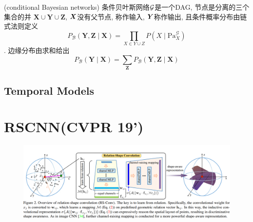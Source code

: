\documentclass{article}
\begin{document}
\begin{flushleft}
    \begin{definition}
        (conditional Bayesian networks) 条件贝叶斯网络$\cal G$是一个DAG, 节点是分离的三个集合的并 $\boldsymbol{X} \cup \boldsymbol{Y} \cup \boldsymbol{Z}$, $\bs X$没有父节点, 称作输入, $\bs Y$称作输出, 且条件概率分布由链式法则定义
        \begin{equation}
            P_{\mathcal{B}}(\boldsymbol{Y}, \boldsymbol{Z} \mid \boldsymbol{X})=\prod_{X \in Y \cup Z} P\left(X \mid \mathrm{Pa}_{X}^{\mathcal{G}}\right)
        \end{equation}.
        边缘分布由求和给出
        \begin{equation}
            P_{\mathcal{B}}(\boldsymbol{Y} \mid \boldsymbol{X})=\sum_{\boldsymbol{Z}} P_{\mathcal{B}}(\boldsymbol{Y}, \boldsymbol{Z} \mid \boldsymbol{X})
        \end{equation}
        
    \end{definition}

\end{flushleft}

\subsection{Temporal Models}
\begin{flushleft}
    
\end{flushleft}

\section{RSCNN(CVPR 19')}
\begin{figure}
    \includegraphics[width=0.85\paperwidth]{rscnn-arch.PNG}
\end{figure}
\end{document}
